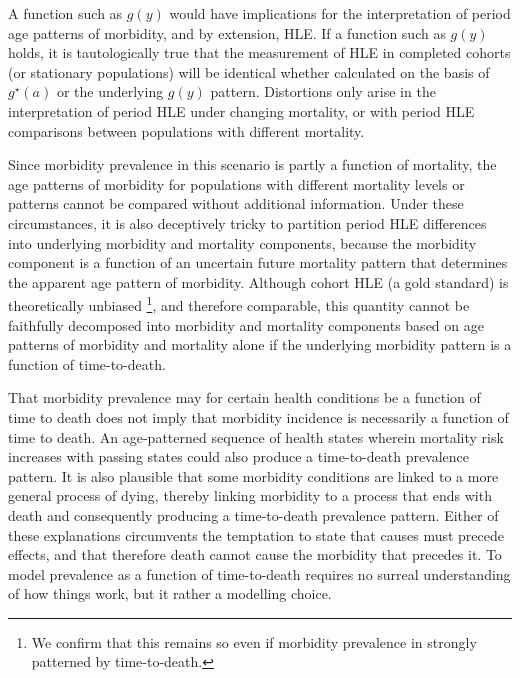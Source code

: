\documentclass[11pt,oneside,a4paper]{article} %
\begin{document}
A function such as $g(y)$ would have implications for the interpretation of
period age patterns of morbidity, and by extension, HLE. If a function such as $g(y)$ holds, it is tautologically true that the
measurement of HLE in completed cohorts (or stationary populations)
will be identical whether calculated on the basis of $g^\star(a)$ or the
underlying $g(y)$ pattern. Distortions only arise in the interpretation of
period HLE under changing mortality, or with period HLE comparisons between
populations with different mortality. 


Since morbidity prevalence in this scenario is partly a function of mortality,
 the age patterns of morbidity for populations with different mortality
levels or patterns cannot be compared without additional information. Under
these circumstances, it is also deceptively tricky to partition period HLE
differences into underlying morbidity and mortality components, because the
morbidity component is a function of an uncertain future mortality pattern
that determines the apparent age pattern of morbidity. Although cohort HLE (a
gold standard) is theoretically unbiased \citep{imai2007estimation}\footnote{We confirm that this remains so even if morbidity prevalence in strongly patterned by time-to-death.}, and therefore comparable, this quantity cannot be faithfully
decomposed into morbidity and mortality components based on age patterns of morbidity and mortality alone if
the underlying morbidity pattern is a function of time-to-death.

That morbidity prevalence may for certain health conditions be a function of
time to death does not imply that morbidity incidence is necessarily a function of time to death. An
age-patterned sequence of health states wherein mortality risk increases with
passing states could also produce a time-to-death prevalence pattern. It is also
plausible that some morbidity conditions are linked to a more general process of
dying, thereby linking morbidity to a process that ends with death and
consequently producing a time-to-death prevalence pattern. Either of
these explanations circumvents the temptation to state that causes must
precede effects, and that therefore death cannot cause the morbidity that
precedes it. To model prevalence as a function of time-to-death requires no
surreal understanding of how things work, but it rather a modelling choice.
 
\end{document}

